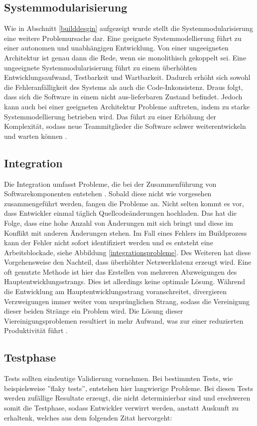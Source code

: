 \subsection{Systemmodularisierung}  \label{Systemmodularisierung}
Wie in Abschnitt \ref{builddesgin} aufgezeigt wurde stellt die Systemmodularisierung eine weitere Problemursache dar. Eine geeignete Systemmodellierung führt zu einer autonomen und unabhängigen Entwicklung. Von einer ungeeigneten Architektur ist genau dann die Rede, wenn sie monolithisch gekoppelt sei. Eine ungeeignete Systemmodularisierung führt zu einem überhöhten Entwicklungsaufwand, Testbarkeit und Wartbarkeit. Dadurch erhöht sich sowohl die Fehleranfälligkeit des Systems als auch die Code-Inkonsistenz. Draus folgt, dass sich die Software in einem nicht aus-lieferbaren Zustand befindet. Jedoch kann auch bei einer geeigneten Architektur Probleme auftreten, indem zu starke Systemmodellierung betrieben wird. Das führt zu einer Erhöhung der Komplexität, sodass neue Teammitglieder die Software schwer weiterentwickeln und warten können \cite{Laukkanen.2017}. 

\subsection{Integration} \label{Integration}
Die Integration umfasst Probleme, die bei der Zusammenführung von Softwarekomponenten entstehen \cite{LianpingEtPaddy.2015}. Sobald diese nicht wie vorgesehen zusammengeführt werden, fangen die Probleme an. Nicht selten kommt es vor, dass Entwickler einmal täglich Quellcodeänderungen hochladen. Das hat die Folge, dass eine hohe Anzahl von Änderungen mit sich bringt und diese im Konflikt mit anderen Änderungen stehen. Im Fall eines Fehlers im Buildprozess kann der Fehler nicht sofort identifiziert werden und es entsteht eine Arbeitsblockade, siehe Abbildung \ref{integrationsprobleme}. Des Weiteren hat diese Vorgehensweise den Nachteil, dass überhöhter Netzwerklatenz erzeugt wird. Eine oft genutzte Methode ist hier das Erstellen von mehreren Abzweigungen des Hauptentwicklungsstrangs. Dies ist allerdings keine optimale Lösung. Während die Entwicklung am Hauptentwicklungsstrang voranschreitet, divergieren Verzweigungen immer weiter vom ursprünglichen Strang, sodass die Vereinigung dieser beiden Stränge ein Problem wird. Die Lösung dieser Viereinigungsproblemen resultiert in mehr Aufwand, was zur einer reduzierten Produktivität führt \cite{Laukkanen.2017}. 

\subsection{Testphase}
Tests sollten eindeutige Validierung vornehmen. Bei bestimmten Tests, wie beispielsweise ''flaky tests'', entstehen hier langwierige Probleme. Bei diesen Tests werden zufällige Resultate erzeugt, die nicht determinierbar sind und erschweren somit die Testphase, sodass Entwickler verwirrt werden, anstatt Auskunft zu erhaltenk, welches aus dem folgenden Zitat hervorgeht: 


